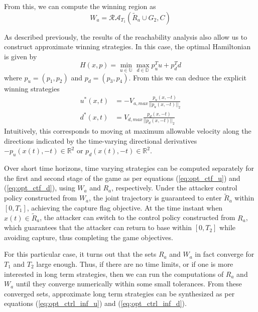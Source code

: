 From this, we can compute the winning region as
\begin{equation}
W_a = \mathcal{RA}_{T_1}(\tilde{R}_a \cup G_2, C)
\end{equation}

As described previously, the results of the reachability analysis also
allow us to construct approximate winning strategies.  In this case,
the optimal Hamiltonian is given by
$$H\left(x,p\right) = \min_{u \in \mathbb{U}} \max_{d \in \mathbb{D}} p_u^T u + p_d^T d$$
where $p_u = (p_1, p_2)$ and $p_d = (p_3, p_4)$.
From this we can deduce the explicit winning strategies
\begin{align}
	\label{eq:opt_ctf_u}
  u^*(x,t) &= -V_{a,max} \frac{p_u(x,-t)}{||p_u(x,-t)||_2} \\
	\label{eq:opt_ctf_d}
  d^*(x,t) &= V_{d,max} \frac{p_d(x,-t)}{||p_d(x,-t)||_2}
\end{align}
Intuitively, this corresponds to moving at maximum allowable velocity along the directions indicated by the time-varying directional derivatives $-p_u(x(t),-t) \in \mathbb{R}^2$ or $p_d(x(t),-t) \in \mathbb{R}^2$.

Over short time horizons, time varying strategies can be computed separately 
for the first and second stage of the game as per equations 
(\ref{eq:opt_ctf_u}) and (\ref{eq:opt_ctf_d}), using $W_a$ and $R_a$,
respectively.  Under the attacker control policy constructed
from $W_a$, the joint trajectory is guaranteed to enter 
$\tilde{R}_a$ within $[0,T_1]$, achieving the capture flag objective.  
At the time instant when $x(t) \in \tilde{R}_a$, the attacker can
switch to the control policy constructed from $R_a$, which guarantees
that the attacker can return to base within $[0,T_2]$ while avoiding
capture, thus completing the game objectives.

For this particular case, it turns out that the sets $R_a$ and $W_a$
in fact converge for $T_1$ and $T_2$ large enough.
Thus, if there are no time limits, or if one is more
interested in long term strategies, then we can run the computations
of $R_a$ and $W_a$ until they converge numerically within 
some small tolerances.  From these converged sets, approximate long
term strategies can be synthesized as per equations
(\ref{eq:opt_ctrl_inf_u}) and (\ref{eq:opt_ctrl_inf_d}).














